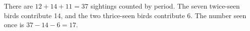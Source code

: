 There are $12+14+11=37$ sightings counted by period. The seven twice-seen birds contribute 14, and the two thrice-seen birds contribute 6. The number seen once is $37-14-6=\boxed{17}$.
